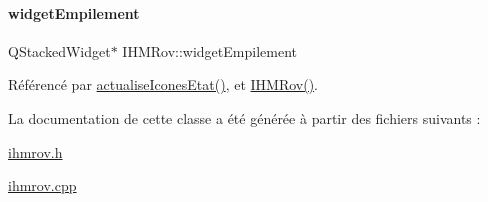 \paragraph{\texorpdfstring{widget\+Empilement}{widgetEmpilement}}
{\footnotesize\ttfamily Q\+Stacked\+Widget$\ast$ I\+H\+M\+Rov\+::widget\+Empilement\hspace{0.3cm}{\ttfamily [private]}}



Référencé par \hyperlink{class_i_h_m_rov_abbfcdc154a6ae7f941d186f6c90a5a2b}{actualise\+Icones\+Etat()}, et \hyperlink{class_i_h_m_rov_a5dac1fb4612866cc61f699a415e0ef6b}{I\+H\+M\+Rov()}.



La documentation de cette classe a été générée à partir des fichiers suivants \+:\begin{DoxyCompactItemize}
\item 
\hyperlink{ihmrov_8h}{ihmrov.\+h}\item 
\hyperlink{ihmrov_8cpp}{ihmrov.\+cpp}\end{DoxyCompactItemize}
